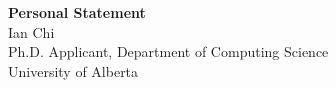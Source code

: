\documentclass[11pt]{article}
\begin{document}
\begin{center}
    {\Large \textbf{Personal Statement}}\\[4pt]
    {\large Ian Chi}\\[2pt]
    Ph.D. Applicant, Department of Computing Science\\
    University of Alberta
\end{center}

\vspace{1em}

\end{document}
